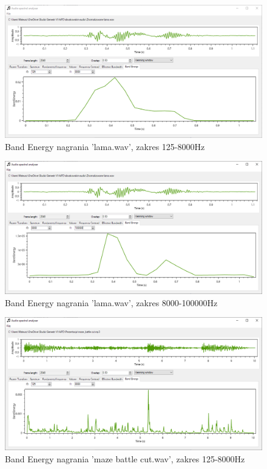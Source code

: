 \documentclass{article}
\begin{document}
\begin{figure}[H]
\includegraphics[width=6in]{scr10.png}
\centering
\caption{Band Energy nagrania 'lama.wav', zakres 125-8000Hz}
\end{figure}

\begin{figure}[H]
\includegraphics[width=6in]{scr11.png}
\centering
\caption{Band Energy nagrania 'lama.wav', zakres 8000-100000Hz}
\end{figure}

\begin{figure}[H]
\includegraphics[width=6in]{scr12.png}
\centering
\caption{Band Energy nagrania 'maze battle cut.wav', zakres 125-8000Hz}
\end{figure}
\end{document}
